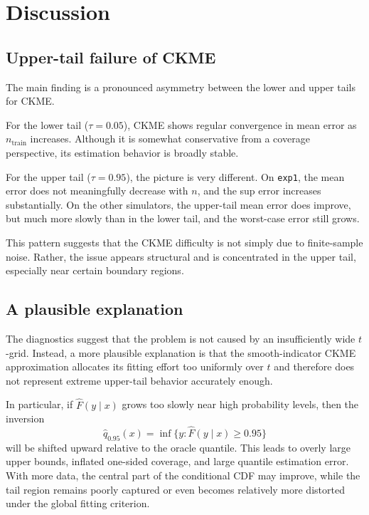 \documentclass[11pt]{article}
\begin{document}
	\section{Discussion}
	
	\subsection{Upper-tail failure of CKME}
	
	The main finding is a pronounced asymmetry between the lower and upper tails for CKME.
	
	For the lower tail ($\tau=0.05$), CKME shows regular convergence in mean error as
	$n_{\mathrm{train}}$ increases. Although it is somewhat conservative from a coverage
	perspective, its estimation behavior is broadly stable.
	
	For the upper tail ($\tau=0.95$), the picture is very different. On \texttt{exp1},
	the mean error does not meaningfully decrease with $n$, and the sup error increases
	substantially. On the other simulators, the upper-tail mean error does improve, but
	much more slowly than in the lower tail, and the worst-case error still grows.
	
	This pattern suggests that the CKME difficulty is not simply due to finite-sample
	noise. Rather, the issue appears structural and is concentrated in the upper tail,
	especially near certain boundary regions.
	
	\subsection{A plausible explanation}
	
	The diagnostics suggest that the problem is not caused by an insufficiently wide
	$t$-grid. Instead, a more plausible explanation is that the smooth-indicator CKME
	approximation allocates its fitting effort too uniformly over $t$ and therefore does
	not represent extreme upper-tail behavior accurately enough.
	
	In particular, if $\hat{F}(y \mid x)$ grows too slowly near high probability levels,
	then the inversion
	\[
	\hat{q}_{0.95}(x)=\inf\{y:\hat{F}(y\mid x)\ge 0.95\}
	\]
	will be shifted upward relative to the oracle quantile. This leads to overly large
	upper bounds, inflated one-sided coverage, and large quantile estimation error.
	With more data, the central part of the conditional CDF may improve, while the tail
	region remains poorly captured or even becomes relatively more distorted under the
	global fitting criterion.
	
\end{document}
